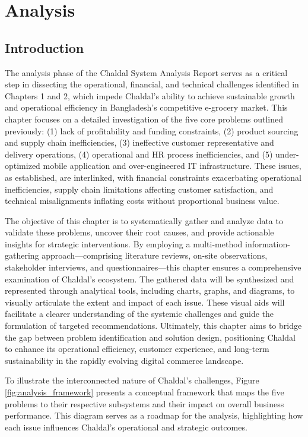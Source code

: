 \documentclass[12pt,a4paper]{article}
\begin{document}
\section{Analysis}
\vspace{0.6em}

\subsection{Introduction}
The analysis phase of the Chaldal System Analysis Report serves as a critical step in dissecting the operational, financial, and technical challenges identified in Chapters 1 and 2, which impede Chaldal’s ability to achieve sustainable growth and operational efficiency in Bangladesh’s competitive e-grocery market. This chapter focuses on a detailed investigation of the five core problems outlined previously: (1) lack of profitability and funding constraints, (2) product sourcing and supply chain inefficiencies, (3) ineffective customer representative and delivery operations, (4) operational and HR process inefficiencies, and (5) under-optimized mobile application and over-engineered IT infrastructure. These issues, as established, are interlinked, with financial constraints exacerbating operational inefficiencies, supply chain limitations affecting customer satisfaction, and technical misalignments inflating costs without proportional business value. 

The objective of this chapter is to systematically gather and analyze data to validate these problems, uncover their root causes, and provide actionable insights for strategic interventions. By employing a multi-method information-gathering approach—comprising literature reviews, on-site observations, stakeholder interviews, and questionnaires—this chapter ensures a comprehensive examination of Chaldal’s ecosystem. The gathered data will be synthesized and represented through analytical tools, including charts, graphs, and diagrams, to visually articulate the extent and impact of each issue. These visual aids will facilitate a clearer understanding of the systemic challenges and guide the formulation of targeted recommendations. Ultimately, this chapter aims to bridge the gap between problem identification and solution design, positioning Chaldal to enhance its operational efficiency, customer experience, and long-term sustainability in the rapidly evolving digital commerce landscape.

To illustrate the interconnected nature of Chaldal’s challenges, Figure \ref{fig:analysis_framework} presents a conceptual framework that maps the five problems to their respective subsystems and their impact on overall business performance. This diagram serves as a roadmap for the analysis, highlighting how each issue influences Chaldal’s operational and strategic outcomes.
\end{document}
